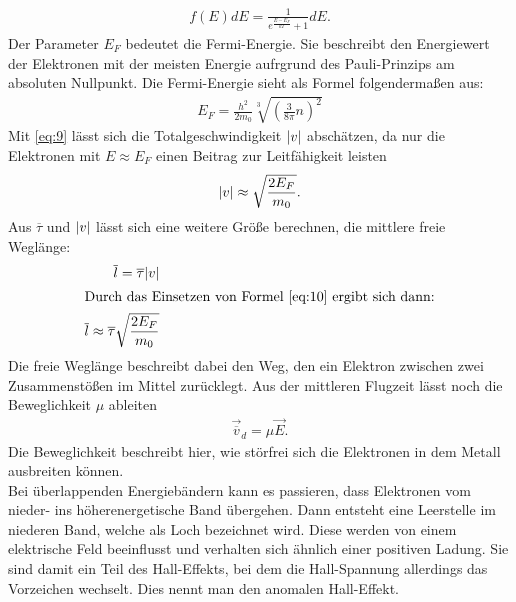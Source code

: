 \begin{align}
    f(E) dE=\frac{1}{e^{\frac{E-E_F}{kT}}+1}dE . \label{eq:8}
\end{align}
Der Parameter $E_F$ bedeutet die Fermi-Energie. Sie beschreibt den Energiewert
der Elektronen mit der meisten Energie aufrgrund des Pauli-Prinzips am absoluten
Nullpunkt. Die Fermi-Energie sieht als Formel folgendermaßen aus: \cite{V311}
\begin{align}
    E_F = \frac{h^2}{2 m_0} \sqrt[3]{\left(\frac{3}{8 \pi}n \right)^2} \label{eq:9}
\end{align}
Mit \eqref{eq:9} lässt sich die Totalgeschwindigkeit $\lvert v\rvert $ abschätzen, da nur die
Elektronen mit $E\approx E_F$ einen Beitrag zur Leitfähigkeit leisten \cite{V311}
\begin{align}
    \lvert v\rvert \approx \sqrt{\frac{2 E_F}{m_0}}. \label{eq:10}
\end{align}
Aus $\overline{\tau}$ und $\lvert v\rvert $ lässt sich eine weitere Größe berechnen, die mittlere
freie Weglänge: \cite{V311}
\begin{align}
    \overline{l} = \overline{\tau} \lvert v\rvert \label{eq:11} \\
    \intertext{Durch das Einsetzen von Formel \eqref{eq:10} ergibt sich dann:}
    \overline{l} \approx \overline{\tau} \sqrt{\frac{2 E_F}{m_0}} \label{eq:12}
\end{align}
Die freie Weglänge beschreibt dabei den Weg, den ein Elektron zwischen zwei Zusammenstößen
im Mittel zurücklegt.
Aus der mittleren Flugzeit lässt noch die Beweglichkeit $\mu$ ableiten \cite{V311}
\begin{align}
    \vec{\overline{v}} _d = \mu \vec{E} \label{eq:13}.
\end{align}
Die Beweglichkeit beschreibt hier, wie störfrei sich die Elektronen in dem Metall 
ausbreiten können.\\
Bei überlappenden Energiebändern kann es passieren, dass Elektronen vom nieder- ins höherenergetische
Band übergehen. Dann entsteht eine Leerstelle im niederen Band, welche als Loch bezeichnet wird.
Diese werden von einem elektrische Feld beeinflusst und verhalten sich ähnlich einer positiven Ladung.
Sie sind damit ein Teil des Hall-Effekts, bei dem die Hall-Spannung allerdings das 
Vorzeichen wechselt. Dies nennt     man den anomalen Hall-Effekt.


